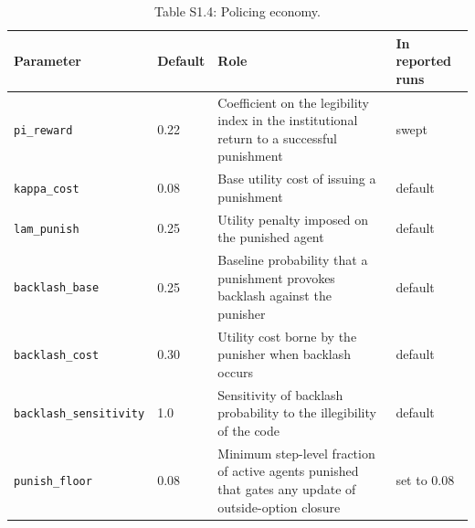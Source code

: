 \documentclass[12pt]{article}
\begin{document}
\begin{table}[htbp]
\centering
\footnotesize
\caption{Table S1.4: Policing economy.}
\begin{tabular}{p{4.9cm}p{1.3cm}p{4.5cm}p{2.4cm}}
\toprule
Parameter & Default & Role & In reported runs \\
\midrule
\texttt{pi\_reward} & 0.22 & Coefficient on the legibility index in the institutional return to a successful punishment & swept \\
\texttt{kappa\_cost} & 0.08 & Base utility cost of issuing a punishment & default \\
\texttt{lam\_punish} & 0.25 & Utility penalty imposed on the punished agent & default \\
\texttt{backlash\_base} & 0.25 & Baseline probability that a punishment provokes backlash against the punisher & default \\
\texttt{backlash\_cost} & 0.30 & Utility cost borne by the punisher when backlash occurs & default \\
\texttt{backlash\_sensitivity} & 1.0 & Sensitivity of backlash probability to the illegibility of the code & default \\
\texttt{punish\_floor} & 0.08 & Minimum step-level fraction of active agents punished that gates any update of outside-option closure & set to 0.08 \\
\bottomrule
\end{tabular}
\end{table}
\end{document}
